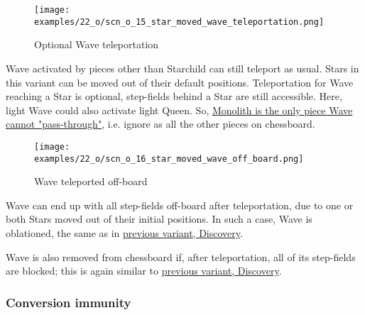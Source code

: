 \vspace*{-0.9\baselineskip}
\noindent
\begin{figure}[!h]
\texttt{[image: examples/22\_o/scn\_o\_15\_star\_moved\_wave\_teleportation.png]}
\caption{Optional Wave teleportation}
\label{fig:scn_o_15_star_moved_wave_teleportation}
\end{figure}

\vspace*{-0.3\baselineskip}
Wave activated by pieces other than Starchild can still teleport as usual. Stars in this variant
can be moved out of their default positions. Teleportation for Wave reaching a Star is optional,
step-fields behind a Star are still accessible. Here, light Wave could also activate light Queen. So,
\hyperref[fig:scn_d_10_teleport_wave_via_monolith]{Monolith is the only piece Wave cannot "pass-through"},
i.e. ignore as all the other pieces on chessboard.

\clearpage %

\vspace*{-2.1\baselineskip}
\noindent
\begin{figure}[!h]
\texttt{[image: examples/22\_o/scn\_o\_16\_star\_moved\_wave\_off\_board.png]}
\caption{Wave teleported off-board}
\label{fig:scn_o_16_star_moved_wave_off_board}
\end{figure}

Wave can end up with all step-fields off-board after teleportation, due to one or both Stars
moved out of their initial positions. In such a case, Wave is oblationed, the same as in
\hyperref[fig:scn_d_12_wave_teleported_off_board]{previous variant, Discovery}.

Wave is also removed from chessboard if, after teleportation, all of its step-fields are
blocked; this is again similar to
\hyperref[fig:scn_d_11_teleported_wave_blocked]{previous variant, Discovery}.

\clearpage %

\subsubsection*{Conversion immunity}

